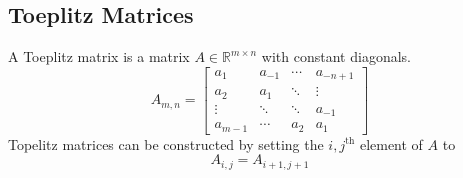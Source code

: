 \subsection{Toeplitz Matrices}
A Toeplitz matrix is a matrix $A\in\mathbb{R}^{m\times n}$ with constant diagonals. 
\begin{equation*}
A_{m,n} = \begin{bmatrix}
a_1 & a_{-1} & \cdots & a_{-n+1}\\
a_2 & a_1 & \ddots & \vdots\\
\vdots & \ddots & \ddots & a_{-1}\\
a_{m-1} & \cdots & a_2 & a_1
\end{bmatrix}
\end{equation*}
Topelitz matrices can be constructed by setting the $i,j^{\mbox{th}}$ element of $A$ to
\begin{equation*}
A_{i,j} = A_{i+1, j+1}
\end{equation*}
